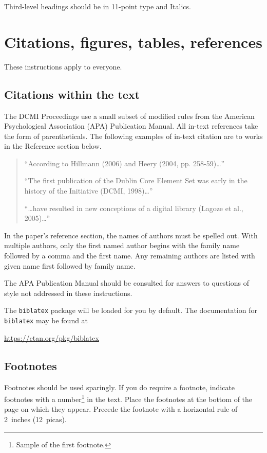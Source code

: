 \documentclass[11pt,a4paper]{article}
\begin{document}
Third-level headings should be in 11-point type and Italics.


\section{Citations, figures, tables, references}
\label{others}

These instructions apply to everyone.

\subsection{Citations within the text}

The DCMI Proceedings use a small subset of modified rules from the American Psychological Association (APA) Publication Manual.  All in-text references take the form of parentheticals.  The following examples of in-text citation are to works in the Reference section below.

\begin{quote}
“According to Hillmann (2006) and Heery (2004, pp. 258-59)…”

“The first publication of the Dublin Core Element Set was early in the history of the Initiative (DCMI, 1998)…”

“…have resulted in new conceptions of a digital library (Lagoze et al., 2005)…”
\end{quote}


In the paper’s reference section, the names of authors must be spelled out.  With multiple authors, only the first named author begins with the family name followed by a comma and the first name.  Any remaining authors are listed with given name first followed by family name.

The APA Publication Manual should be consulted for answers to questions of style not addressed in these instructions.

The \verb+biblatex+ package will be loaded for you by default. The documentation for \verb+biblatex+ may be found at
\begin{center}
\url{https://ctan.org/pkg/biblatex}
\end{center}

\subsection{Footnotes}

Footnotes should be used sparingly.  If you do require a footnote, indicate
footnotes with a number\footnote{Sample of the first footnote.} in the
text. Place the footnotes at the bottom of the page on which they appear.
Precede the footnote with a horizontal rule of 2~inches (12~picas).
\end{document}
